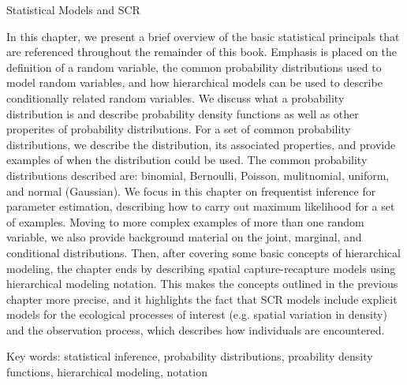 Statistical Models and SCR

In this chapter, we present a brief overview of the basic
statistical principals that are referenced throughout the remainder of
this book. Emphasis is placed on the definition of a random variable,
the common probability distributions used to model random variables,
and how hierarchical models can be used to describe conditionally
related random variables.   We discuss what a probability distribution is and 
describe probability density functions as well as other properites of probability
distributions.  For a set of common probability distributions, we describe the distribution, 
its associated properties, and provide examples of when the distribution could be
used.  The common probability distributions described are: binomial, Bernoulli, Poisson, 
mulitnomial, uniform, and normal (Gaussian).
We focus in this chapter on frequentist inference for parameter estimation, describing how
to carry out maximum likelihood for a set of examples.  Moving to more
complex examples of more than one random variable, we also provide background
material on the joint, marginal, and conditional distributions.
Then, after covering some basic concepts of hierarchical modeling, the
chapter ends by describing spatial capture-recapture models using
hierarchical modeling notation. This makes the concepts outlined in
the previous chapter more precise, and it highlights the fact that SCR
models include explicit models for the ecological
processes of interest (e.g. spatial variation in density) and the
observation process, which describes how individuals are encountered.

Key words: statistical inference, probability distributions, proability density functions, 
hierarchical modeling, notation 